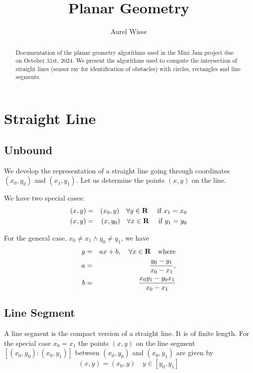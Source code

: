\documentclass[11pt]{article}
\newcommand{\Rb}{{\bf{R}}}
\begin{document}
%
%
\title{Planar Geometry}
\author{Aurel Wisse}
\maketitle
%
%
\begin{abstract}
Documentation of the planar geometry algorithms used in the
Mini Jam project due on October 31st, 2024. We present the algorithms used to
compute the intersection of straight lines (sensor ray for identification
of obstacles) with circles, rectangles and line segments.
\end{abstract}

%
\section{Straight Line}
\label{sec-straight-line}

\subsection{Unbound}
\label{sec:unbound}
We develop the representation of a straight line going through
coordinates $(x_0, y_0)$ and $(x_1, y_1)$. Let us determine the points $(x,
y)$ on the line.

We have two special cases:
\begin{eqnarray}
    (x, y) &=& (x_0, y)\quad\forall y\in\Rb\quad \text{ if } x_1 = x_0
    \label{eq-line-x1x0} \\
    (x, y) &=& (x, y_0)\quad\forall x\in\Rb\quad \text{ if } y_1 = y_0
    \label{eq-line-y1y0}
\end{eqnarray}

For the general case, $x_0 \neq x_1 \land y_0 \neq y_1$, we have
\begin{eqnarray}
    y &=& ax+b,\quad \forall x\in\Rb\quad \text{where}\label{eq-line-general}\\
    a &=& \frac{y_0 - y_1}{x_0 - x_1}, \notag \\
    b &=& \frac{x_0 y_1 - y_0 x_1}{x_0 - x_1} \notag
\end{eqnarray}

\subsection{Line Segment}
\label{sec-line-segment}
A line segment is the compact version of a straight line. It is of finite
length. For the special case $x_0 = x_1$ the points $(x, y)$ on the line
segment $[(x_0, y_0):(x_0, y_1)]$ between $(x_0, y_0)$ and $(x_0, y_1)$ are
given by
\begin{equation}
    (x, y) = (x_0, y)\quad y\in [y_0, y_1]\label{eq-seg-x1x0}
\end{equation}
\end{document}
